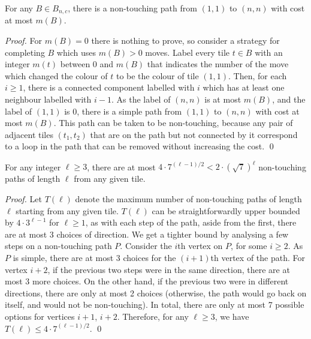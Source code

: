 \documentclass[a4paper,11pt]{llncs}
\newcounter{l}
\renewcommand{\geq}{\geqslant}
\renewcommand{\leq}{\leqslant}
\begin{document}
\begin{lemma}
    \label{lem:pathcost}
    For any $B \in B_{n,c}$, there is a non-touching path from $(1,1)$ to $(n,n)$ with cost at most $m(B)$.
\end{lemma}

\begin{proof}
    For $m(B)=0$ there is nothing to prove, so consider a strategy for completing $B$ which uses $m(B)>0$ moves. Label every tile $t \in B$ with an integer $m(t)$ between 0 and $m(B)$ that indicates the number of the move which changed the colour of $t$ to be the colour of tile $(1,1)$. Then, for each $i \geq 1$, there is a connected component labelled with $i$ which has at least one neighbour labelled with $i-1$. As the label of $(n,n)$ is at most $m(B)$, and the label of $(1,1)$ is 0, there is a simple path from $(1,1)$ to $(n,n)$ with cost at most $m(B)$. This path can be taken to be non-touching, because any pair of adjacent tiles $(t_1,t_2)$ that are on the path but not connected by it correspond to a loop in the path that can be removed without increasing the cost.
    \qed
\end{proof}

\begin{lemma}
    \label{lem:pathcount}
    For any integer $\ell\geq 3$, there are at most $4 \cdot 7^{(\ell-1)/2} < 2 \cdot (\sqrt{7})^\ell$ non-touching paths of length $\ell$ from any given tile.
\end{lemma}

\begin{proof}
    Let $T(\ell)$ denote the maximum number of non-touching paths of length $\ell$ starting from any given tile. $T(\ell)$ can be straightforwardly upper bounded by $4 \cdot 3^{\ell-1}$ for $\ell \geq 1$, as with each step of the path, aside from the first, there are at most 3 choices of direction. We get a tighter bound by analysing a few steps on a non-touching path $P$. Consider the $i$th vertex on $P$, for some $i \geq 2$. As $P$ is simple, there are at most 3 choices for the $(i+1)$th vertex of the path. For vertex $i+2$, if the previous two steps were in the same direction, there are at most 3 more choices. On the other hand, if the previous two were in different directions, there are only at most 2 choices (otherwise, the path would go back on itself, and would not be non-touching). In total, there are only at most 7 possible options for vertices $i+1$, $i+2$. Therefore, for any $\ell \geq 3$, we have $T(\ell) \leq 4 \cdot 7^{(\ell-1)/2}$.
    \qed
\end{proof}
\end{document}
